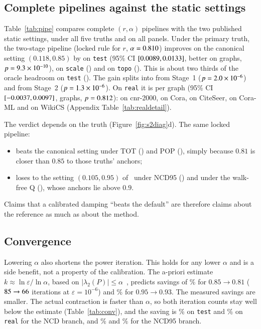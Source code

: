 \documentclass[11pt,a4paper]{article}
\theoremstyle{definition}
\theoremstyle{remark}
\begin{document}
\subsection{Complete pipelines against the static settings}
Table~\ref{tab:pipe} compares complete $(r,\alpha)$ pipelines with the two published static settings,
under all five truths and on all panels. Under the primary truth, the two-stage pipeline (locked rule
for $r$, $\alpha=0.810$) improves on the canonical setting $(0.118,0.85)$ by \TwoTestD{} on
\texttt{test} (95\% CI $[0.0089,0.0133]$, better on \TwoTestWins{} graphs, $p=9.3\times10^{-10}$),
\TwoScaleD{} on \texttt{scale} (\TwoScaleWins) and \TwoTopoD{} on \texttt{topo} (\TwoTopoWins). This is
about two thirds of the oracle headroom on \texttt{test} (\PipeNcdOracleVsLoTest). The gain splits into
\StoTestD{} from Stage~1 ($p=2.0\times10^{-6}$) and \SthTestD{} from Stage~2 ($p=1.3\times10^{-6}$). On \texttt{real}
it is \TwoRealD{} per graph (95\% CI $[-0.0037,0.0097]$, \TwoRealWins{} graphs, $p=0.812$):
\TwoRealCnr{} on cnr-2000, \TwoRealCorafull{} on Cora, \TwoRealCiteseer{} on CiteSeer, \TwoRealCoraml{}
on Cora-ML and \TwoRealWikics{} on WikiCS (Appendix Table~\ref{tab:realdetail}).

The verdict depends on the truth (Figure~\ref{fig:s2diag}d). The same locked pipeline:
\begin{itemize}[leftmargin=1.4em,itemsep=0pt]
\item beats the canonical setting under TOT (\PipeTotTwoVsLoTest) and POP (\PipePopTwoVsLoTest), simply
because $0.81$ is closer than $0.85$ to those truths' anchors;
\item loses to the setting $(0.105,0.95)$ of~\cite{ng13} under NCD95 (\PipeNcdnfTwoVsHiTest) and under
the walk-free Q (\PipeQTwoVsHiTest), whose anchors lie above $0.9$.
\end{itemize}
Claims that a calibrated damping ``beats the default'' are therefore claims about the reference as much
as about the method.



\subsection{Convergence}
Lowering $\alpha$ also shortens the power iteration. This holds for any lower $\alpha$ and is a side
benefit, not a property of the calibration. The a-priori estimate $k\approx\ln\varepsilon/\ln\alpha$,
based on $|\lambda_2(P)|\le\alpha$~\cite{haveliwala03,ng13}, predicts savings of \ConvNcdBound\% for
$0.85\to0.81$ ($85\to66$ iterations at $\varepsilon=10^{-6}$) and \ConvNfBound\% for
$0.95\to0.93$. The measured savings are smaller. The actual contraction is faster than $\alpha$, so
both iteration counts stay well below the estimate (Table~\ref{tab:conv}), and the saving is
\ConvNcdTest\% on \texttt{test} and \ConvNcdReal\% on \texttt{real} for the NCD branch, and \ConvNfTest\%
and \ConvNfReal\% for the NCD95 branch.
\end{document}
